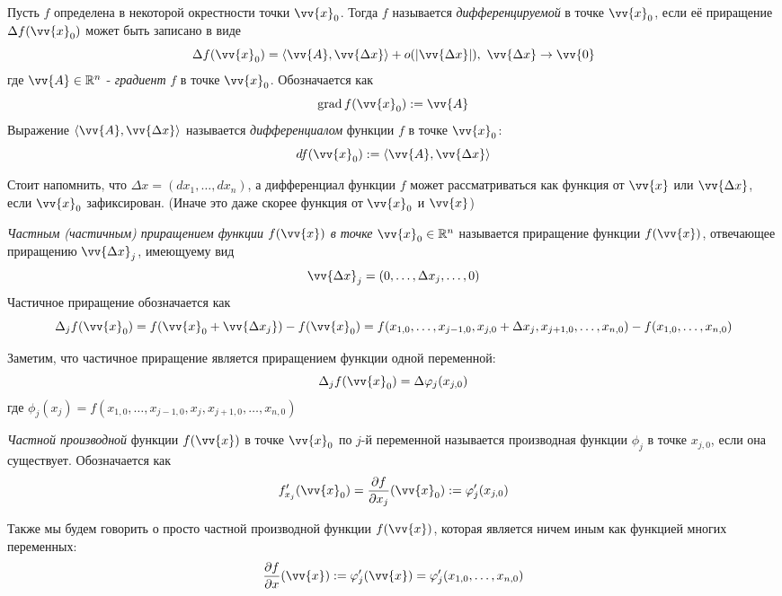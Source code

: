 \begin{definition}
	Пусть $f$ определена в некоторой окрестности точки $\vv{x}_0$. Тогда $f$ называется \textit{дифференцируемой} в точке $\vv{x}_0$, если её приращение $\Delta f(\vv{x}_0)$ может быть записано в виде
	\[
		\Delta f(\vv{x}_0) = \trbr{\vv{A}, \vv{\Delta x}} + o(|\vv{\Delta x}|),\ \vv{\Delta x} \to \vv{0}
	\]
	где $\vv{A} \in \R^n$ - \textit{градиент} $f$ в точке $\vv{x}_0$. Обозначается как
	\[
		\grad f(\vv{x}_0) := \vv{A}
	\]
	Выражение $\trbr{\vv{A}, \vv{\Delta x}}$ называется \textit{дифференциалом} функции $f$ в точке $\vv{x}_0$:
	\[
		df(\vv{x}_0) := \trbr{\vv{A}, \vv{\Delta x}}
	\]
\end{definition}

\begin{anote}
	Стоит напомнить, что $\Delta x = (dx_1, \ldots, dx_n)$, а дифференциал функции $f$ может рассматриваться как функция от $\vv{x}$ или $\vv{\Delta x}$, если $\vv{x}_0$ зафиксирован. (Иначе это даже скорее функция от $\vv{x}_0$ и $\vv{x}$)
\end{anote}

\begin{definition}
	\textit{Частным (частичным) приращением функции $f(\vv{x})$ в точке} $\vv{x}_0 \in \R^n$ называется приращение функции $f(\vv{x})$, отвечающее 	приращению $\vv{\Delta x}_j$, имеющуему вид
	\[
		\vv{\Delta x}_j = (0, \ldots, \Delta x_j, \ldots, 0)
	\]
	Частичное приращение обозначается как
	\[
		\Delta_j f(\vv{x}_0) = f(\vv{x}_0 + \vv{\Delta x_j}) - f(\vv{x}_0) = f(x_{1, 0}, \ldots, x_{j - 1, 0}, x_{j, 0} + \Delta x_j, x_{j + 1, 0}, \ldots, x_{n, 0}) - f(x_{1, 0}, \ldots, x_{n, 0})
	\]
\end{definition}

\begin{note}
	Заметим, что частичное приращение является приращением функции одной переменной:
	\[
		\Delta_j f(\vv{x}_0) = \Delta \phi_j (x_{j, 0})
	\]
	где $\phi_j(x_j) = f(x_{1, 0}, \ldots, x_{j - 1, 0}, x_j, x_{j + 1, 0}, \ldots, x_{n, 0})$
\end{note}

\begin{definition}
	\textit{Частной производной} функции $f(\vv{x})$ в точке $\vv{x}_0$ по $j$-й переменной называется производная функции $\phi_j$ в точке $x_{j, 0}$, если она существует. Обозначается как 
	\[
		f'_{x_j}(\vv{x}_0) = \pd{f}{x_j} (\vv{x}_0) := \phi'_j (x_{j, 0})
	\]
\end{definition}

\begin{definition}
	Также мы будем говорить о просто частной производной функции $f(\vv{x})$, которая является ничем иным как функцией многих переменных:
	\[
		\pd{f}{x} (\vv{x}) := \phi'_j(\vv{x}) = \phi'_j (x_{1, 0}, \ldots, x_{n, 0})
	\]
\end{definition}

